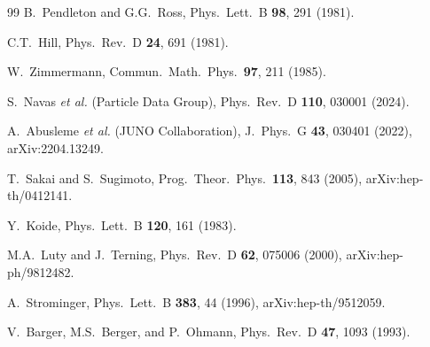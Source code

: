 \documentclass[aps,prd,twocolumn,showpacs,preprintnumbers,superscriptaddress,floatfix]{revtex4-2}
\begin{document}
\begin{thebibliography}{99}
  B.~Pendleton and G.G.~Ross,
  Phys.\ Lett.\ B \textbf{98}, 291 (1981).

  C.T.~Hill,
  Phys.\ Rev.\ D \textbf{24}, 691 (1981).

  W.~Zimmermann,
  Commun.\ Math.\ Phys.\ \textbf{97}, 211 (1985).

  S.~Navas \textit{et al.} (Particle Data Group),
  Phys.\ Rev.\ D \textbf{110}, 030001 (2024).

  A.~Abusleme \textit{et al.} (JUNO Collaboration),
  J.\ Phys.\ G \textbf{43}, 030401 (2022),
  arXiv:2204.13249.

  T.~Sakai and S.~Sugimoto,
  Prog.\ Theor.\ Phys.\ \textbf{113}, 843 (2005),
  arXiv:hep-th/0412141.

  Y.~Koide,
  Phys.\ Lett.\ B \textbf{120}, 161 (1983).

  M.A.~Luty and J.~Terning,
  Phys.\ Rev.\ D \textbf{62}, 075006 (2000),
  arXiv:hep-ph/9812482.

  A.~Strominger,
  Phys.\ Lett.\ B \textbf{383}, 44 (1996),
  arXiv:hep-th/9512059.

  V.~Barger, M.S.~Berger, and P.~Ohmann,
  Phys.\ Rev.\ D \textbf{47}, 1093 (1993).

\end{thebibliography}
\end{document}
